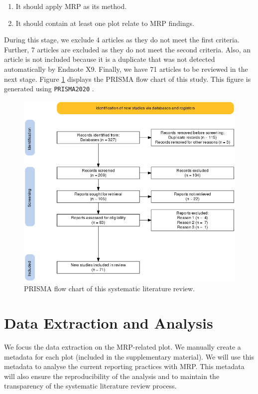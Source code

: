 \documentclass{monashthesis}
\begin{document}
\begin{enumerate}
\def\labelenumi{\arabic{enumi}.}
\tightlist
\item
  It should apply MRP as its method.
\item
  It should contain at least one plot relate to MRP findings.
\end{enumerate}

During this stage, we exclude 4 articles as they do not meet the first criteria. Further, 7 articles are excluded as they do not meet the second criteria. Also, an article is not included because it is a duplicate that was not detected automatically by Endnote X9. Finally, we have 71 articles to be reviewed in the next stage. Figure \ref{fig:prisma-flowchart} displays the PRISMA flow chart of this study. This figure is generated using \texttt{PRISMA2020} \autocite{prisma2020}.

\begin{figure}
\includegraphics[width=0.9\linewidth]{figures/prisma_fc} \caption{PRISMA flow chart of this systematic literature review.}\label{fig:prisma-flowchart}
\end{figure}

\hypertarget{data-extraction-and-analysis}{%
\section{Data Extraction and Analysis}\label{data-extraction-and-analysis}}

We focus the data extraction on the MRP-related plot. We manually create a metadata for each plot (included in the supplementary material). We will use this metadata to analyse the current reporting practices with MRP. This metadata will also ensure the reproducibility of the analysis and to maintain the transparency of the systematic literature review process.
\end{document}
